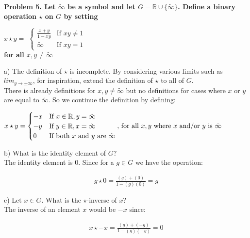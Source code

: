 \documentclass[20pt]{article}
\begin{document}
\noindent
\textbf{Problem 5. Let $\tilde{\infty}$ be a symbol and let $G = \mathbb{R} \cup \{\tilde{\infty}\}$. Define a binary operation $\star$ on $G$ by setting}

$x \star y =$
$
\begin{cases}
  \frac{x + y}{1 - xy} & \text{If } xy \neq 1\\    
  \tilde{\infty} & \text{If } xy = 1
\end{cases}$\\
\textbf{for all $x,y \neq \tilde{\infty}$}\\
\begin{text}
    \noindent
    a) The definition of $\star$ is incomplete. By considering various limits such as $lim_{y \longrightarrow \pm \infty}$, for inspiration, extend the definition of $\star$ to all of $G$.\\
    
    There is already definitions for $x, y \neq \tilde{\infty}$ but no definitions for cases where $x$ or $y$ are equal to $\tilde{\infty}$. So we continue the definition by defining:
    
    $
    x \star y =
    \begin{cases}
        -x & \text{If $x \in \mathbb{R}, y = \tilde{\infty}$}\\
        -y & \text{If $y \in \mathbb{R}, x = \tilde{\infty}$}\\
        0 & \text{If both $x$ and $y$ are $\tilde{\infty}$}
    \end{cases}
    \text {, for all $x, y$ where $x$ and/or $y$ is $\tilde{\infty}$}\\
    $
    
    \noindent
    b) What is the identity element of $G$?\\
    
    The identity element is $0$. Since for a $g \in G$ we have the operation:
    
    \begin{align}
        g \star 0 = \frac{(g) + (0)}{1 - (g)(0)} = g\nonumber
    \end{align}
    
    \noindent
    c) Let $x \in G$. What is the $\star$-inverse of $x$?\\
    
    The inverse of an element $x$ would be $-x$ since:
    
    \begin{align}
        x \star -x = \frac{(g) + (-g)}{1 - (g)(-g)} = 0\nonumber
    \end{align}
    

\end{text}
\end{document}

